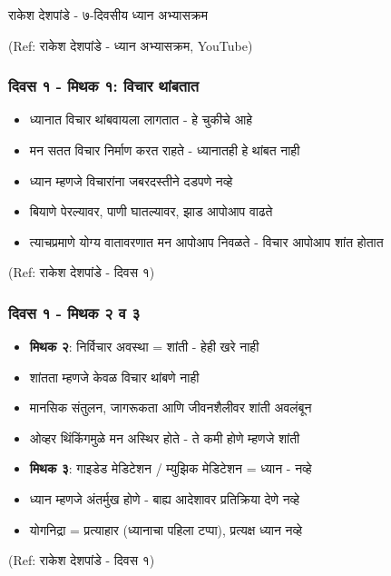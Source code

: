 \begin{frame}[fragile]\frametitle{}
\begin{center}
{\Large राकेश देशपांडे - ७-दिवसीय ध्यान अभ्यासक्रम}
\end{center}

{\tiny (Ref: राकेश देशपांडे - ध्यान अभ्यासक्रम, YouTube)}

\end{frame}


\begin{frame}[fragile]\frametitle{दिवस १ - मिथक १: विचार थांबतात}

	\begin{itemize}
	\item ध्यानात विचार थांबवायला लागतात - हे चुकीचे आहे
	\item मन सतत विचार निर्माण करत राहते - ध्यानातही हे थांबत नाही
	\item ध्यान म्हणजे विचारांना जबरदस्तीने दडपणे नव्हे
	\item बियाणे पेरल्यावर, पाणी घातल्यावर, झाड आपोआप वाढते
	\item त्याचप्रमाणे योग्य वातावरणात मन आपोआप निवळते - विचार आपोआप शांत होतात
	\end{itemize}

{\tiny (Ref: राकेश देशपांडे - दिवस १)}

\end{frame}

\begin{frame}[fragile]\frametitle{दिवस १ - मिथक २ व ३}

	\begin{itemize}
	\item \textbf{मिथक २}: निर्विचार अवस्था = शांती - हेही खरे नाही
	\item शांतता म्हणजे केवळ विचार थांबणे नाही
	\item मानसिक संतुलन, जागरूकता आणि जीवनशैलीवर शांती अवलंबून
	\item ओव्हर थिंकिंगमुळे मन अस्थिर होते - ते कमी होणे म्हणजे शांती
	\item \textbf{मिथक ३}: गाइडेड मेडिटेशन / म्युझिक मेडिटेशन = ध्यान - नव्हे
	\item ध्यान म्हणजे अंतर्मुख होणे - बाह्य आदेशावर प्रतिक्रिया देणे नव्हे
	\item योगनिद्रा = प्रत्याहार (ध्यानाचा पहिला टप्पा), प्रत्यक्ष ध्यान नव्हे
	\end{itemize}

{\tiny (Ref: राकेश देशपांडे - दिवस १)}

\end{frame}

